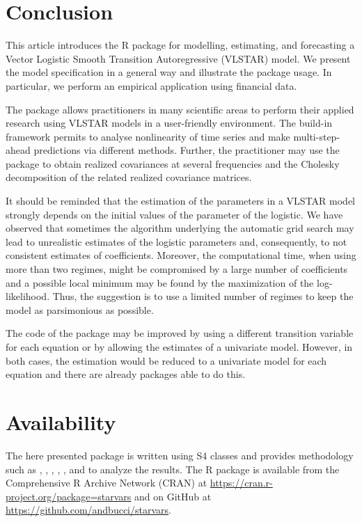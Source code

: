 				
\section{Conclusion} \label{Section5}

This article introduces the R package  for modelling, estimating, and forecasting a Vector Logistic Smooth Transition Autoregressive (VLSTAR) model. We present the model specification in a general way and illustrate the package usage. In particular, we perform an empirical application using financial data.

The package allows practitioners in many scientific areas to perform their applied research using VLSTAR models in a user-friendly environment. The build-in framework permits to analyse nonlinearity of time series and make multi-step-ahead predictions via different methods. Further, the practitioner may use the  package to obtain realized covariances at several frequencies and the Cholesky decomposition of the related realized covariance matrices.

It should be reminded that the estimation of the parameters in a VLSTAR model strongly depends on the initial values of the parameter of the logistic. We have observed that sometimes the algorithm underlying the automatic grid search may lead to unrealistic estimates of the logistic parameters and, consequently, to not consistent estimates of coefficients. Moreover, the computational time, when using more than two regimes, might be compromised by a large number of coefficients and a possible local minimum may be found by the maximization of the log-likelihood. Thus, the suggestion is to use a limited number of regimes to keep the model as parsimonious as possible.

The code of the package  may be improved by using a different transition variable for each equation or by allowing the estimates of a univariate model. However, in both cases, the estimation would be reduced to a univariate model for each equation and there are already packages able to do this. 

				
\section{Availability}
The here presented package is written using S4 classes and provides methodology such as , , , , ,  and  to analyze the results. The R package  is available from the Comprehensive R Archive Network (CRAN) at \url{https://cran.r-project.org/package=starvars} and on GitHub at \url{https://github.com/andbucci/starvars}.

